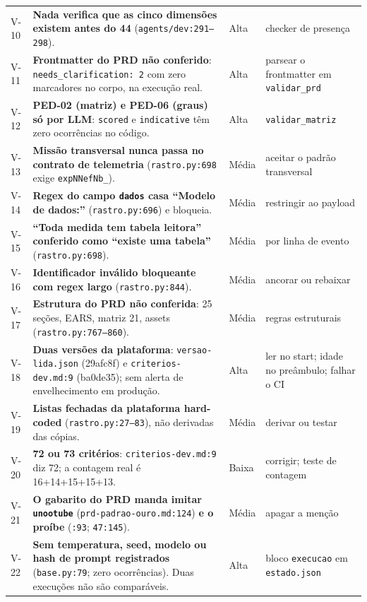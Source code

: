 \documentclass[11pt,a4paper]{article}
\begin{document}
\begin{longtable}{@{}p{0.9cm} >{\raggedright\arraybackslash}p{8.6cm} p{1.1cm} >{\raggedright\arraybackslash}p{4.9cm}@{}}
V-10 & \textbf{Nada verifica que as cinco dimensões existem antes do 44} (\texttt{agents/dev:291--298}). & Alta & checker de presença \\
V-11 & \textbf{Frontmatter do PRD não conferido}: \texttt{needs\_clarification: 2} com zero marcadores no corpo, na execução real. & Alta & parsear o frontmatter em \texttt{validar\_prd} \\
V-12 & \textbf{PED-02 (matriz) e PED-06 (graus) só por LLM}: \texttt{scored} e \texttt{indicative} têm zero ocorrências no código. & Alta & \texttt{validar\_matriz} \\
V-13 & \textbf{Missão transversal nunca passa no contrato de telemetria} (\texttt{rastro.py:698} exige \texttt{expNNefNb\_}). & Média & aceitar o padrão transversal \\
V-14 & \textbf{Regex do campo \texttt{dados} casa ``Modelo de dados:''} (\texttt{rastro.py:696}) e bloqueia. & Média & restringir ao payload \\
V-15 & \textbf{``Toda medida tem tabela leitora'' conferido como ``existe uma tabela''} (\texttt{rastro.py:698}). & Média & por linha de evento \\
V-16 & \textbf{Identificador inválido bloqueante com regex largo} (\texttt{rastro.py:844}). & Média & ancorar ou rebaixar \\
V-17 & \textbf{Estrutura do PRD não conferida}: 25 seções, EARS, matriz 21, assets (\texttt{rastro.py:767--860}). & Média & regras estruturais \\
V-18 & \textbf{Duas versões da plataforma}: \texttt{versao-lida.json} (29afc8f) e \texttt{criterios-dev.md:9} (ba0de35); sem alerta de envelhecimento em produção. & Alta & ler no start; idade no preâmbulo; falhar o CI \\
V-19 & \textbf{Listas fechadas da plataforma hard-coded} (\texttt{rastro.py:27--83}), não derivadas das cópias. & Média & derivar ou testar \\
V-20 & \textbf{72 ou 73 critérios}: \texttt{criterios-dev.md:9} diz 72; a contagem real é 16+14+15+15+13. & Baixa & corrigir; teste de contagem \\
V-21 & \textbf{O gabarito do PRD manda imitar \texttt{unootube}} (\texttt{prd-padrao-ouro.md:124}) \textbf{e o proíbe} (\texttt{:93}; \texttt{47:145}). & Média & apagar a menção \\
V-22 & \textbf{Sem temperatura, seed, modelo ou hash de prompt registrados} (\texttt{base.py:79}; zero ocorrências). Duas execuções não são comparáveis. & Alta & bloco \texttt{execucao} em \texttt{estado.json} \\

\end{longtable}
\end{document}

